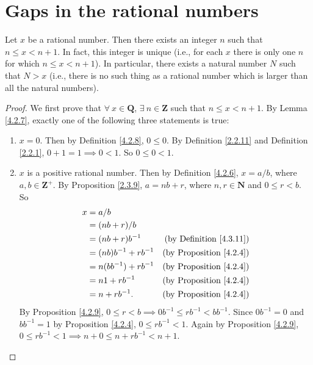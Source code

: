 \section{Gaps in the rational numbers}\label{sec 4.4}

\begin{proposition}\label{4.4.1}
Let \(x\) be a rational number.
Then there exists an integer \(n\) such that \(n \leq x < n + 1\).
In fact, this integer is unique (i.e., for each \(x\) there is only one \(n\) for which \(n \leq x < n + 1\)).
In particular, there exists a natural number \(N\) such that \(N > x\)
(i.e., there is no such thing as a rational number which is larger than all the natural numbers).
\end{proposition}

\begin{proof}
We first prove that \(\forall\ x \in \mathbf{Q}\), \(\exists\ n \in \mathbf{Z}\) such that \(n \leq x < n + 1\).
By Lemma \ref{4.2.7}, exactly one of the following three statements is true:
\begin{enumerate}
    \item \(x = 0\).
    Then by Definition \ref{4.2.8}, \(0 \leq 0\).
    By Definition \ref{2.2.11} and Definition \ref{2.2.1}, \(0 + 1 = 1 \implies 0 < 1\).
    So \(0 \leq 0 < 1\).
    \item \(x\) is a positive rational number.
    Then by Definition \ref{4.2.6}, \(x = a / b\), where \(a, b \in \mathbf{Z}^+\).
    By Proposition \ref{2.3.9}, \(a = nb + r\), where \(n, r \in \mathbf{N}\) and \(0 \leq r < b\).
    So
    \begin{align*}
    x &= a / b \\
    &= (nb + r) / b \\
    &= (nb + r)b^{-1} & \text{(by Definition \ref{4.3.11})} \\
    &= (nb)b^{-1} + rb^{-1} & \text{(by Proposition \ref{4.2.4})} \\
    &= n(bb^{-1}) + rb^{-1} & \text{(by Proposition \ref{4.2.4})} \\
    &= n1 + rb^{-1} & \text{(by Proposition \ref{4.2.4})} \\
    &= n + rb^{-1}. & \text{(by Proposition \ref{4.2.4})}
    \end{align*}
    By Proposition \ref{4.2.9}, \(0 \leq r < b \implies 0b^{-1} \leq rb^{-1} < bb^{-1}\).
    Since \(0b^{-1} = 0\) and \(bb^{-1} = 1\) by Proposition \ref{4.2.4}, \(0 \leq rb^{-1} < 1\).
    Again by Proposition \ref{4.2.9}, \(0 \leq rb^{-1} < 1 \implies n + 0 \leq n + rb^{-1} < n + 1\).

\end{enumerate}
\end{proof}
